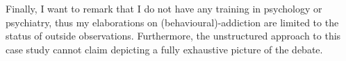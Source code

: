Finally, I want to remark that I do not have any training in psychology or psychiatry, thus my elaborations on (behavioural)-addiction are limited to the status of outside observations. Furthermore, the unstructured approach to this case study cannot claim depicting a fully exhaustive picture of the debate.